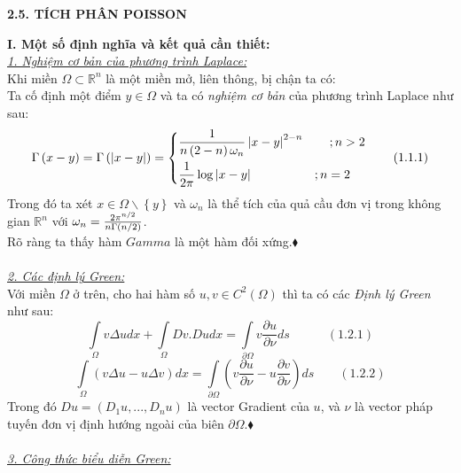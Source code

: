 \begin{center}
\textbf{2.5. TÍCH PHÂN POISSON}
\end{center}

\noindent\textbf{I. Một số định nghĩa và kết quả cần thiết:}
\\ \textit{\underline{1. Nghiệm cơ bản của phương trình Laplace:} }
\\
Khi miền $
\Omega  \subset \mathbb{R}^n 
$ là một miền mở, liên thông, bị chận ta có:
\\
Ta cố định một điểm $
y \in \Omega 
$ và ta có 
{\it nghiệm cơ bản} 
của phương trình Laplace như sau:
\[
\Gamma \left( {x - y} \right) = \Gamma \left( {\left| {x - y} \right|} \right) = \left\{ \begin{gathered}
  \frac{1}
{{n\left( {2 - n} \right)\omega _n }}\left| {x - y} \right|^{2 - n} \quad \quad ;n > 2 \hfill \\
  \frac{1}
{{2\pi }}\log \left| {x - y} \right|\quad \quad \quad \quad \quad ;n = 2 \hfill \\ 
\end{gathered}  \right.\quad \quad \left( {1.1.1} \right)
\]
Trong đó ta xét $
x \in \Omega \backslash \left\{ y \right\}
$ và $
{\omega _n }
$ là thể tích của quả cầu đơn vị trong không gian $
\mathbb{R}^n 
$ với $
\omega _n  = \frac{{2\pi ^{{n \mathord{\left/
 {\vphantom {n 2}} \right.
 \kern-\nulldelimiterspace} 2}} }}
{{n\Gamma \left( {{n \mathord{\left/
 {\vphantom {n 2}} \right.
 \kern-\nulldelimiterspace} 2}} \right)}}
$.\\
Rõ ràng ta thấy hàm $Gamma$ là một hàm đối xứng.$\blacklozenge$\\
\\ \textit{\underline{2. Các định lý Green:} }\\
Với miền $
\Omega 
$ ở trên, cho hai hàm số $
u,v \in C^2 \left( \Omega  \right)
$ thì ta có các {\it Định lý Green} như sau:
\[
\int\limits_\Omega  {v\Delta udx}  + \int\limits_\Omega  {Dv.Dudx}  = \int\limits_{\partial \Omega } {v\frac{{\partial u}}
{{\partial \nu }}ds} \quad \quad \quad \left( {1.2.1} \right)
\]
\[
\int\limits_\Omega  {\left( {v\Delta u - u\Delta v} \right)dx}  = \int\limits_{\partial \Omega } {\left( {v\frac{{\partial u}}
{{\partial \nu }} - u\frac{{\partial v}}
{{\partial \nu }}} \right)ds} \quad \quad \left( {1.2.2} \right)
\]
Trong đó $
Du = \left( {D_1 u,...,D_n u} \right)
$ là vector Gradient của $u$, và $
\nu 
$ là vector pháp tuyến đơn vị định hướng ngoài của biên $
\partial \Omega 
$.$\blacklozenge$\\
\\ \textit{\underline{3. Công thức biểu diễn Green:} }\\
